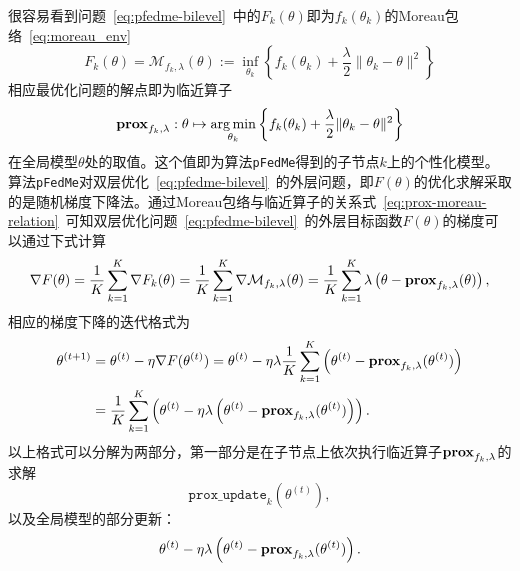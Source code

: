 

很容易看到问题~\eqref{eq:pfedme-bilevel}~中的$F_k(\theta)$即为$f_k(\theta_k)$的Moreau包络~\eqref{eq:moreau_env}
\begin{equation*}
F_k(\theta) = \mathcal{M}_{f_k, \lambda} (\theta) := \inf\limits_{\theta_k} \left\{ f_k(\theta_k) + \frac{\lambda}{2} \lVert \theta_k - \theta \rVert^2 \right\}
\end{equation*}
相应最优化问题的解点即为临近算子
\begin{equation*}
\mathbf{prox}_{f_k, \lambda}: \theta \mapsto \operatorname*{arg\,min}_{\theta_k} \left\{ f_k(\theta_k) + \frac{\lambda}{2} \lVert \theta_k - \theta \rVert^2 \right\}
\end{equation*}
在全局模型$\theta$处的取值。这个值即为算法\texttt{pFedMe}得到的子节点$k$上的个性化模型。算法\texttt{pFedMe}对双层优化~\eqref{eq:pfedme-bilevel}~的外层问题，即$F(\theta)$的优化求解采取的是随机梯度下降法。通过Moreau包络与临近算子的关系式~\eqref{eq:prox-moreau-relation}~可知双层优化问题~\eqref{eq:pfedme-bilevel}~的外层目标函数$F(\theta)$的梯度可以通过下式计算
\begin{equation}
\label{eq:pfedme-grad}
\nabla F(\theta) = \frac{1}{K} \sum\limits_{k=1}^K \nabla F_k(\theta) = \frac{1}{K} \sum\limits_{k=1}^K \nabla \mathcal{M}_{f_k, \lambda} (\theta) = \frac{1}{K} \sum\limits_{k=1}^K \lambda \left( \theta - \mathbf{prox}_{f_k, \lambda} (\theta) \right),
\end{equation}
相应的梯度下降的迭代格式为
\begin{equation}
\label{eq:pfedme-iter}
\begin{aligned}
\theta^{(t+1)} & = \theta^{(t)} - \eta \nabla F(\theta^{(t)}) = \theta^{(t)} - \eta \lambda \frac{1}{K} \sum\limits_{k=1}^K \left( \theta^{(t)} - \mathbf{prox}_{f_k, \lambda} (\theta^{(t)}) \right) \\
& = \frac{1}{K} \sum\limits_{k=1}^K \left( \theta^{(t)} - \eta \lambda \left( \theta^{(t)} - \mathbf{prox}_{f_k, \lambda} (\theta^{(t)}) \right) \right).
\end{aligned}
\end{equation}
以上格式可以分解为两部分，第一部分是在子节点上依次执行临近算子$\mathbf{prox}_{f_k, \lambda}$的求解
\begin{equation}
\label{eq:pfedme-prox-1}
\texttt{prox\_update}_k (\theta^{(t)}),
\end{equation}
以及全局模型的部分更新：
\begin{equation}
\label{eq:pfedme-local-1}
\theta^{(t)} - \eta \lambda \left( \theta^{(t)} - \mathbf{prox}_{f_k, \lambda} (\theta^{(t)}) \right).
\end{equation}
